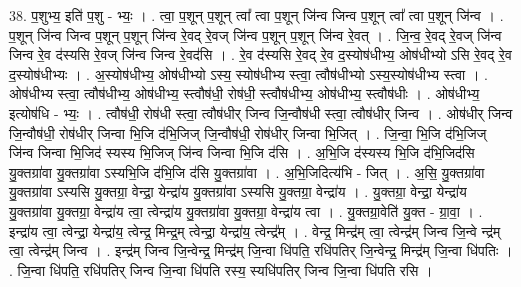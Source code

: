 \documentclass[17pt]{extarticle}
\begin{document}
38. प॒शुभ्य॒ इति॑ प॒शु - भ्यः॒ । . त्वा॒ प॒शून् प॒शून् त्वा᳚ त्वा प॒शून् जि॑न्व जिन्व प॒शून् त्वा᳚ त्वा प॒शून् जि॑न्व । . प॒शून् जि॑न्व जिन्व प॒शून् प॒शून् जि॑न्व रे॒वद् रे॒वज् जि॑न्व प॒शून् प॒शून् जि॑न्व रे॒वत् । . जि॒न्व॒ रे॒वद् रे॒वज् जि॑न्व जिन्व रे॒व द॑स्यसि रे॒वज् जि॑न्व जिन्व रे॒वद॑सि । . रे॒व द॑स्यसि रे॒वद् रे॒व द॒स्योष॑धीभ्य॒ ओष॑धीभ्यो ऽसि रे॒वद् रे॒व द॒स्योष॑धीभ्यः । . अ॒स्योष॑धीभ्य॒ ओष॑धीभ्यो ऽस्य॒ स्योष॑धीभ्य स्त्वा॒ त्वौष॑धीभ्यो ऽस्य॒स्योष॑धीभ्य स्त्वा । . ओष॑धीभ्य स्त्वा॒ त्वौष॑धीभ्य॒ ओष॑धीभ्य॒ स्त्वौष॑धी॒ रोष॑धी॒ स्त्वौष॑धीभ्य॒ ओष॑धीभ्य॒ 
स्त्वौष॑धीः । . ओष॑धीभ्य॒ इत्योष॑धि - भ्यः॒ । . त्वौष॑धी॒ रोष॑धी स्त्वा॒ त्वौष॑धीर् जिन्व जि॒न्वौष॑धी स्त्वा॒ त्वौष॑धीर् जिन्व । . ओष॑धीर् जिन्व जि॒न्वौष॑धी॒ रोष॑धीर् जिन्वा भि॒जि द॑भि॒जिज् जि॒न्वौष॑धी॒ रोष॑धीर् जिन्वा भि॒जित् । . जि॒न्वा॒ भि॒जि द॑भि॒जिज् जि॑न्व जिन्वा भि॒जिद॑ स्यस्य भि॒जिज् जि॑न्व जिन्वा भि॒जि द॑सि । . अ॒भि॒जि द॑स्यस्य भि॒जि द॑भि॒जिद॑सि यु॒क्तग्रा॑वा यु॒क्तग्रा॑वा ऽस्यभि॒जि द॑भि॒जि द॑सि यु॒क्तग्रा॑वा । . अ॒भि॒जिदित्य॑भि - जित् । . अ॒सि॒ यु॒क्तग्रा॑वा यु॒क्तग्रा॑वा ऽस्यसि यु॒क्तग्रा॒ वेन्द्रा॒ येन्द्रा॑य यु॒क्तग्रा॑वा ऽस्यसि यु॒क्तग्रा॒ वेन्द्रा॑य । . यु॒क्तग्रा॒ वेन्द्रा॒ येन्द्रा॑य यु॒क्तग्रा॑वा यु॒क्तग्रा॒ वेन्द्रा॑य त्वा॒ त्वेन्द्रा॑य यु॒क्तग्रा॑वा यु॒क्तग्रा॒ वेन्द्रा॑य त्वा । . यु॒क्तग्रा॒वेति॑ यु॒क्त - ग्रा॒वा॒ । . इन्द्रा॑य त्वा॒ त्वेन्द्रा॒ येन्द्रा॑य॒ त्वेन्द्र॒ मिन्द्र॒म् त्वेन्द्रा॒ येन्द्रा॑य॒ त्वेन्द्र᳚म् । . वेन्द्र॒ मिन्द्र॑म् त्वा॒ त्वेन्द्र॑म् जिन्व जि॒न्वे न्द्र॑म् त्वा॒ त्वेन्द्र॑म् जिन्व । . इन्द्र॑म् जिन्व जि॒न्वेन्द्र॒ मिन्द्र॑म् जि॒न्वा धि॑पति॒ रधि॑पतिर् जि॒न्वेन्द्र॒ मिन्द्र॑म् जि॒न्वा धि॑पतिः । . जि॒न्वा धि॑पति॒ रधि॑पतिर् जिन्व जि॒न्वा धि॑पति रस्य॒ स्यधि॑पतिर् जिन्व जि॒न्वा धि॑पति रसि । \newline
\end{document}
